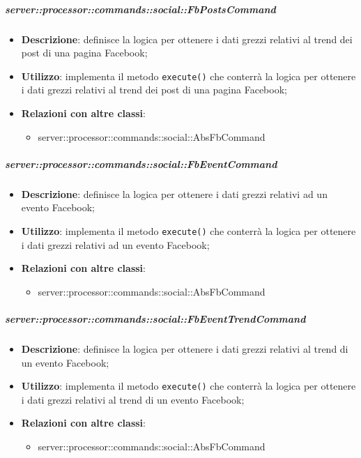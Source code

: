         \subparagraph{server::processor::commands::social::FbPostsCommand} %
        \label{subp:bdsm_app_server_processor_commands_social_fbpostscommand}
        \begin{itemize}
          \item \textbf{Descrizione}: definisce la logica per ottenere i dati grezzi relativi al trend dei post di una pagina Facebook;
          \item \textbf{Utilizzo}: implementa il metodo \texttt{execute()} che conterrà la logica per ottenere i dati grezzi relativi al trend dei post di una pagina Facebook;
          \item \textbf{Relazioni con altre classi}:
            \begin{itemize}
              \item server::processor::commands::social::AbsFbCommand
            \end{itemize}
        \end{itemize}

        \subparagraph{server::processor::commands::social::FbEventCommand} %
        \label{subp:bdsm_app_server_processor_commands_social_fbeventcommand}
        \begin{itemize}
          \item \textbf{Descrizione}: definisce la logica per ottenere i dati grezzi relativi ad un evento Facebook;
          \item \textbf{Utilizzo}: implementa il metodo \texttt{execute()} che conterrà la logica per ottenere i dati grezzi relativi ad un evento Facebook;
          \item \textbf{Relazioni con altre classi}:
            \begin{itemize}
              \item server::processor::commands::social::AbsFbCommand
            \end{itemize}
        \end{itemize}

        \subparagraph{server::processor::commands::social::FbEventTrendCommand} %
        \label{subp:bdsm_app_server_processor_commands_social_fbeventtrendcommand}
        \begin{itemize}
          \item \textbf{Descrizione}: definisce la logica per ottenere i dati grezzi relativi al trend di un evento Facebook;
          \item \textbf{Utilizzo}: implementa il metodo \texttt{execute()} che conterrà la logica per ottenere i dati grezzi relativi al trend di un evento Facebook;
          \item \textbf{Relazioni con altre classi}:
            \begin{itemize}
              \item server::processor::commands::social::AbsFbCommand
            \end{itemize}
        \end{itemize}


